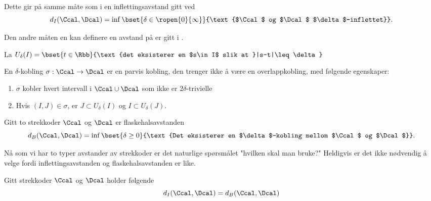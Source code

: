Dette gir på samme måte som i  en inflettingsavstand gitt ved
\[d_I(\Ccal,\Dcal) = \inf\bset{\delta\in\ropen{0}{\infty}}{\text{$\Ccal$ og $\Dcal$ $\delta$-inflettet}}.\]

Den andre måten en kan definere en avstand på er gitt i \cite[seksjon 4.2]{Bauer2018}.

La $U_\delta(I) = \bset{t\in\Rbb}{\text{det eksisterer en $s\in I$ slik at }|s-t|\leq\delta}$

\begin{definisjon}\label{def:delta-kobling}
En $\delta$-kobling $\sigma:\Ccal\to \Dcal$ er en parvis kobling, den trenger ikke å være en overlappkobling, med følgende egenskaper:
\begin{enumerate}
    \item $\sigma$ kobler hvert intervall i $\Ccal\cup\Dcal$ som ikke er $2\delta$-trivielle\\
    \item Hvis $(I,J)\in\sigma$, er $J\subset U_\delta(I)$ og $I\subset U_\delta(J)$.
\end{enumerate}
\end{definisjon}

\begin{definisjon}\label{def:FlaskAvst}
Gitt to strekkoder $\Ccal$ og $\Dcal$ er flaskehalsavstanden
\[d_B(\Ccal,\Dcal) = \inf\bset{\delta\geq 0}{\text{Det eksisterer en $\delta$-kobling mellom $\Ccal$ og $\Dcal$}}.\]
\end{definisjon}

Nå som vi har to typer avstander av strekkoder er det
naturlige spørsmålet "hvilken skal man bruke?" Heldigvis
er det ikke nødvendig å velge fordi inflettingsavstanden
og flaskehalsavstanden er like.

\begin{teorem}\label{trm:FA_lik_IA}
Gitt strekkoder $\Ccal$ og $\Dcal$ holder følgende
\[d_I(\Ccal,\Dcal) = d_B(\Ccal,\Dcal)\]
\end{teorem}
\bevis{

}

